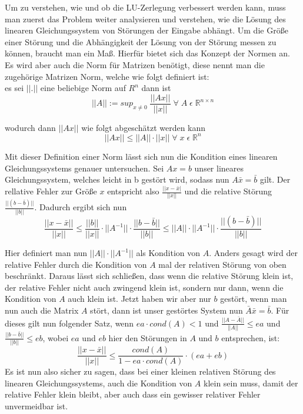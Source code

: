 \documentclass[course=erap]{aspdoc}
\begin{document}
Um zu verstehen, wie und ob die LU-Zerlegung verbessert werden kann, muss man 
zuerst das Problem weiter analysieren und verstehen, wie die Lösung des linearen 
Gleichungssystem von Störungen der Eingabe abhängt. 
Um die Größe einer Störung und die Abhängigkeit der Lösung von der Störung messen zu 
können, braucht man ein Maß. Hierfür bietet sich das Konzept der Normen an. Es wird aber 
auch die Norm für Matrizen benötigt, diese nennt man die zugehörige Matrizen Norm, 
welche wie folgt definiert ist: \\
es sei $||.||$ eine beliebige Norm auf $R^n$ dann ist  
  \begin{equation}
    \label{norm}
    ||A|| := sup_{x\neq 0}\;\frac{||Ax||}{||x||}\; \forall\; A \;\epsilon \;\mathbb{R}^{n \times n}
  \end{equation}

wodurch dann $||Ax||$ wie folgt abgeschätzt werden kann
  \begin{equation}
    \label{norm}
    ||Ax|| \leq ||A|| \cdot ||x||\;  \forall\; x \;\epsilon \;\mathbb{R}^n 
  \end{equation}

Mit dieser Definition einer Norm lässt sich nun die Kondition eines linearen 
Gleichungssystems genauer untersuchen. Sei $Ax=b$ unser lineares Gleichungssystem, 
welches leicht in b gestört wird, sodass nun $A \bar{x}=\bar{b}$ gilt.
Der rellative Fehler zur Größe $x$ entspricht also 
$\frac{||x-\bar{x}|}{||x||}$ und die relative Störung 
$\frac{||(b-\bar{b})||}{||b||}$. Dadurch ergibt sich nun 
  \begin{equation}
    \label{norm}
    \frac{||x- \bar{x}||}{||x||}   \leq    \frac{||b||} {||x||} \cdot ||A^{-1}|| \cdot \frac{||b-\bar{b}||}{||b||} \leq ||A|| \cdot ||A^{-1}|| \cdot \frac{||(b-\bar{b})||} {||b||}
  \end{equation}
 
Hier definiert man nun $||A|| \cdot ||A^{-1}||$ als Kondition von $A$. Anders gesagt wird 
der relative Fehler durch die Kondition von $A$ mal der relativen Störung 
von oben beschränkt. Daraus lässt sich schließen, dass wenn die relative Störung klein 
ist, der relative Fehler nicht auch zwingend klein ist, sondern nur dann, wenn die 
Kondition von $A$ auch klein ist.
Jetzt haben wir aber nur $b$ gestört, wenn man nun auch die Matrix $A$ stört, dann ist 
unser gestörtes System nun $\bar{A} \bar{x} = \bar{b}$. Für dieses gilt nun folgender Satz, 
wenn $ea \cdot cond(A) < 1$ und $\frac{||A - \bar{A}||} {||A||} \leq ea $	und 	$\frac{||b - \bar{b}||} {||b||} \leq eb $, wobei 
$ea$ und $eb$ hier den Störungen in $A$ und $b$ entsprechen, ist:\\
  \begin{equation}
    \frac{||x-\bar{x}||} {||x||} \leq \frac{cond(A)} {1- ea \cdot cond(A)} \cdot (ea + eb)   
  \end{equation}
Es ist nun also sicher zu sagen, dass bei einer kleinen relativen Störung des linearen 
Gleichungssystems, auch die Kondition von $A$ klein sein muss, damit der relative Fehler 
klein bleibt, aber auch dass ein gewisser relativer Fehler unvermeidbar ist.
\end{document}
